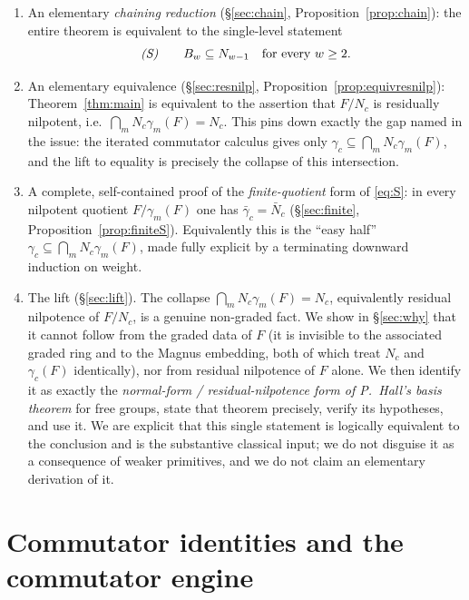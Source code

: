 \documentclass{amsart}
\theoremstyle{definition}
\theoremstyle{remark}
\begin{document}
\begin{enumerate}
\item[(I)] An elementary \emph{chaining reduction} (\S\ref{sec:chain},
Proposition~\ref{prop:chain}): the entire theorem is equivalent to the single-level
statement
\begin{equation}\label{eq:S}
\text{\emph{(S)}}\qquad B_w\subseteq N_{w-1}\quad\text{for every }w\ge 2 .
\end{equation}
\item[(II)] An elementary equivalence (\S\ref{sec:resnilp},
Proposition~\ref{prop:equivresnilp}): Theorem~\ref{thm:main} is equivalent to the
assertion that $F/N_c$ is residually nilpotent, i.e.\ $\bigcap_{m} N_c\gamma_m(F)=N_c$.
This pins down exactly the gap named in the issue: the iterated commutator calculus
gives only $\gamma_c\subseteq\bigcap_m N_c\gamma_m(F)$, and the lift to equality is
precisely the collapse of this intersection.
\item[(III)] A complete, self-contained proof of the \emph{finite-quotient} form of
\eqref{eq:S}: in every nilpotent quotient $F/\gamma_m(F)$ one has $\bar\gamma_c=\bar
N_c$ (\S\ref{sec:finite}, Proposition~\ref{prop:finiteS}). Equivalently this is the
``easy half'' $\gamma_c\subseteq\bigcap_m N_c\gamma_m(F)$, made fully explicit by a
terminating downward induction on weight.
\item[(IV)] The lift (\S\ref{sec:lift}). The collapse $\bigcap_m N_c\gamma_m(F)=N_c$,
equivalently residual nilpotence of $F/N_c$, is a genuine non-graded fact. We show in
\S\ref{sec:why} that it cannot follow from the graded data of $F$ (it is invisible to
the associated graded ring and to the Magnus embedding, both of which treat $N_c$ and
$\gamma_c(F)$ identically), nor from residual nilpotence of $F$ alone. We then
identify it as exactly the \emph{normal-form / residual-nilpotence form of P.~Hall's
basis theorem} for free groups, state that theorem precisely, verify its hypotheses,
and use it. We are explicit that this single statement is logically equivalent to the
conclusion and is the substantive classical input; we do not disguise it as a
consequence of weaker primitives, and we do not claim an elementary derivation of it.
\end{enumerate}

\section{Commutator identities and the commutator engine}\label{sec:engine}
\end{document}
